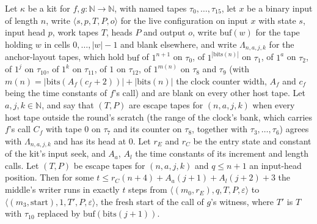 \begin{theorem}
\label{Turing.NTimeDiag.qy_mid_code}
\leanok
{}
Let $\kappa$ be a kit for $f, g : \mathbb{N} \to \mathbb{N}$, with named tapes $\tau_0, \dots,
\tau_{15}$, let $x$ be a binary input of length $n$, write $\langle s, p, T, P, o\rangle$ for the
live configuration on input $x$ with state $s$, input head $p$, work tapes $T$, heads $P$ and
output $o$, write $\mathrm{buf}(w)$ for the tape holding $w$ in cells $0, \dots, |w| - 1$ and blank
elsewhere, and write $\Lambda_{n,a,j,k}$ for the anchor-layout tapes, which hold $\mathrm{buf}$ of
$1^{n+1}$ on $\tau_0$, of $1^{|\mathrm{bits}(n)|}$ on $\tau_1$, of $1^a$ on $\tau_2$, of $1^j$ on
$\tau_{10}$, of $1^k$ on $\tau_{11}$, of $1$ on $\tau_{12}$, of $1^{m(n)}$ on $\tau_8$ and $\tau_9$
(with $m(n) = |\mathrm{bits}(A_f(c_f + 2))| + |\mathrm{bits}(n)|$ the clock counter width, $A_f$
and $c_f$ being the time constants of $f$'s call) and are blank on every other host tape. Let $a,
j, k \in \mathbb{N}$, and say that $(T, P)$ are escape tapes for $(n, a, j, k)$ when every host
tape outside the round's scratch (the range of the clock's bank, which carries $f$'s call $C_f$
with tape $0$ on $\tau_7$ and its counter on $\tau_8$, together with $\tau_3, \dots, \tau_6$)
agrees with $\Lambda_{n,a,j,k}$ and has its head at $0$. Let $r_E$ and $r_C$ be the entry state and
constant of the kit's input seek, and $A_a$, $A_l$ the time constants of its increment and length
calls. Let $(T, P)$ be escape tapes for $(n, a, j, k)$ and $q \le n + 1$ an input-head position.
Then for some $t \le r_C(n + 4) + A_a(j + 1) + A_l(j + 2) + 3$ the middle's writer runs in exactly
$t$ steps from $\langle (m_0, r_E), q, T, P, \varepsilon\rangle$ to $\langle (m_3, \mathrm{start}),
1, T', P, \varepsilon\rangle$, the fresh start of the call of $g$'s witness, where $T'$ is $T$ with
$\tau_{10}$ replaced by $\mathrm{buf}(\mathrm{bits}(j + 1))$.
\end{theorem}

